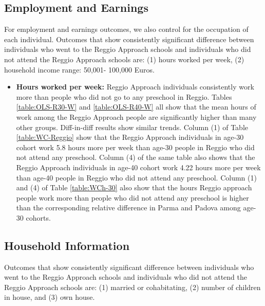 \documentclass[11pt]{article}
\begin{document}
\subsection{Employment and Earnings}
For employment and earnings outcomes, we also control for the occupation of each individual. Outcomes that show consistently significant difference between individuals who went to the Reggio Approach schools and individuals who did not attend the Reggio Approach schools are: (1) hours worked per week, (2) household income range: 50,001- 100,000 Euros.

\begin{itemize}
\item \textbf{Hours worked per week:} Reggio Approach individuals consistently work more than people who did not go to any preschool in Reggio. Tables \ref{table:OLS-R30-W} and \ref{table:OLS-R40-W} all show that the mean hours of work among the Reggio Approach people are significantly higher than many other groups. Diff-in-diff results show similar trends. Column (1) of Table \ref{table:WC-Reggio} show that the Reggio Approach individuals in age-30 cohort work 5.8 hours more per week than age-30 people in Reggio who did not attend any preschool. Column (4) of the same table also shows that the Reggio Approach individuals in age-40 cohort work 4.22 hours more per week than age-40 people in Reggio who did not attend any preschool. Column (1) and (4) of Table \ref{table:WCh-30} also show that the hours Reggio approach people work more than people who did not attend any preschool is higher than the corresponding relative difference in Parma and Padova among age-30 cohorts.  
\end{itemize}  

\subsection{Household Information}
Outcomes that show consistently significant difference between individuals who went to the Reggio Approach schools and individuals who did not attend the Reggio Approach schools are: (1) married or cohabitating, (2) number of children in house, and (3) own house.
\end{document}
